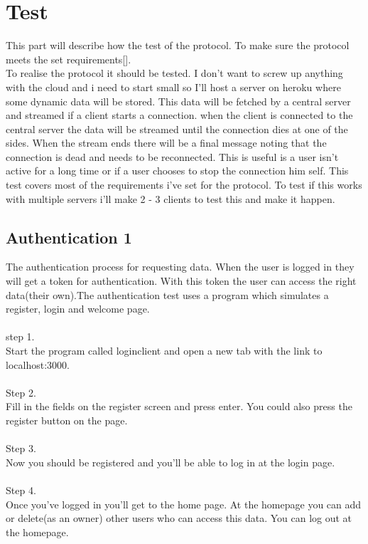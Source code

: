 \documentclass{article}
\begin{document}
\section{Test}\label{sec:test}
This part will describe how the test of the protocol. To make sure the protocol meets the set requirements[\pageref{sec:requirements}].\\
To realise the protocol it should be tested. I don't want to screw up anything with the cloud and i need to start small so I'll host a server on heroku where some dynamic data will be stored. This data will be fetched by a central server and streamed if a client starts a connection. when the client is connected to the central server the data will be streamed until the connection dies at one of the sides. When the stream ends there will be a final message noting that the connection is dead and needs to be reconnected. This is useful is a user isn't active for a long time or if a user chooses to stop the connection him self. This test covers most of the requirements i've set for the protocol. To test if this works with multiple servers i'll make 2 - 3 clients to test this and make it happen. \\

\subsection{Authentication 1}\label{authentication1}
The authentication process for requesting data. When the user is logged in they will get a token for authentication. With this token the user can access the right data(their own).The authentication test uses a program which simulates a register, login and welcome page. \\
\\
step 1.
\\
Start the program called loginclient and open a new tab with the link to localhost:3000.\\
\\
Step 2.
\\
Fill in the fields on the register screen and press enter. You could also press the register button on the page. \\
\\
Step 3. \\
Now you should be registered and you'll be able to log in at the login page. \\
\\
Step 4.\\
Once you've logged in you'll get to the home page. At the homepage you can add or delete(as an owner) other users who can access this data. You can log out at the homepage.\\
\\
\end{document}
